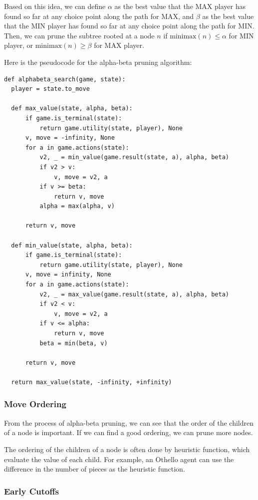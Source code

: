 \documentclass[a4paper,12pt]{article}
\begin{document}
Based on this idea, we can define $\alpha$ as the best value that the MAX player has found so far at any choice point along the path for MAX, and $\beta$ as the best value that the MIN player has found so far at any choice point along the path for MIN. Then, we can prune the subtree rooted at a node $n$ if $\text{minimax}(n) \leq \alpha$ for MIN player, or $\text{minimax}(n) \geq \beta$ for MAX player.

Here is the pseudocode for the alpha-beta pruning algorithm:
\begin{verbatim}
def alphabeta_search(game, state):
  player = state.to_move

  def max_value(state, alpha, beta):
      if game.is_terminal(state):
          return game.utility(state, player), None
      v, move = -infinity, None
      for a in game.actions(state):
          v2, _ = min_value(game.result(state, a), alpha, beta)
          if v2 > v:
              v, move = v2, a
          if v >= beta:
              return v, move
          alpha = max(alpha, v)
          
      return v, move

  def min_value(state, alpha, beta):
      if game.is_terminal(state):
          return game.utility(state, player), None
      v, move = infinity, None
      for a in game.actions(state):
          v2, _ = max_value(game.result(state, a), alpha, beta)
          if v2 < v:
              v, move = v2, a
          if v <= alpha:
              return v, move
          beta = min(beta, v)
          
      return v, move

  return max_value(state, -infinity, +infinity)
\end{verbatim}

\subsubsection{Move Ordering}

From the process of alpha-beta pruning, we can see that the order of the children of a node is important. If we can find a good ordering, we can prune more nodes. 

The ordering of the children of a node is often done by heuristic function, which evaluate the value of each child. For example, an Othello agent can use the difference in the number of pieces as the heuristic function.

\subsubsection{Early Cutoffs}
\end{document}
